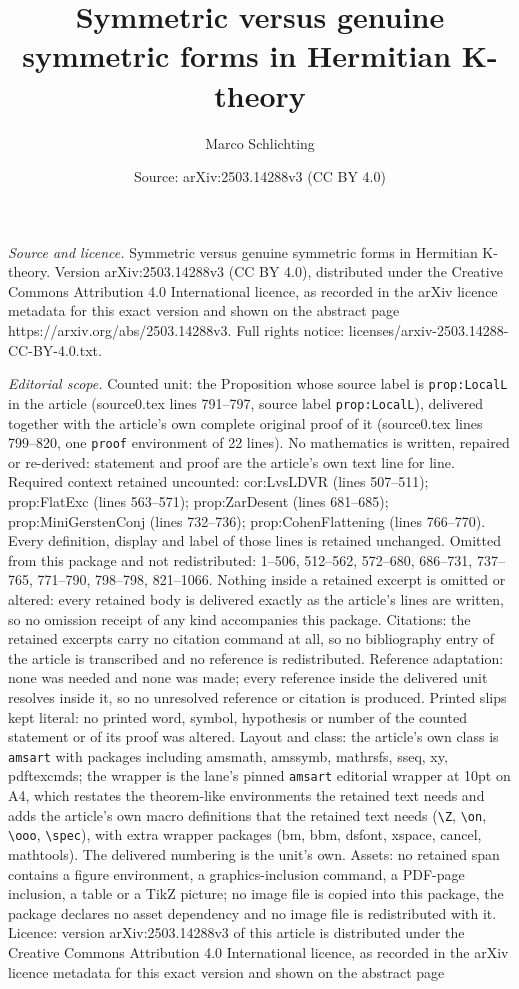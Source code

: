 \documentclass[10pt,a4paper]{amsart}
\title[Symmetric versus genuine symmetric forms in Hermitian K-theo]{Symmetric versus genuine symmetric forms in Hermitian K-theory}
\author{Marco Schlichting}
\date{Source: arXiv:2503.14288v3 (CC BY 4.0)}
\begin{document}
\maketitle

\noindent\emph{Source and licence.} Symmetric versus genuine symmetric forms in Hermitian K-theory. Version arXiv:2503.14288v3 (CC BY 4.0), distributed under the Creative Commons Attribution 4.0 International licence, as recorded in the arXiv licence metadata for this exact version and shown on the abstract page https://arxiv.org/abs/2503.14288v3. Full rights notice: licenses/arxiv-2503.14288-CC-BY-4.0.txt.\par\smallskip

\noindent\textit{Editorial scope.} Counted unit: the Proposition whose source label is \texttt{prop:LocalL} in the article (source0.tex lines 791--797, source label \texttt{prop:LocalL}), delivered together with the article's own complete original proof of it (source0.tex lines 799--820, one \texttt{proof} environment of 22 lines). No mathematics is written, repaired or re-derived: statement and proof are the article's own text line for line. Required context retained uncounted: cor:LvsLDVR (lines 507--511); prop:FlatExc (lines 563--571); prop:ZarDesent (lines 681--685); prop:MiniGerstenConj (lines 732--736); prop:CohenFlattening (lines 766--770). Every definition, display and label of those lines is retained unchanged. Omitted from this package and not redistributed: 1--506, 512--562, 572--680, 686--731, 737--765, 771--790, 798--798, 821--1066. Nothing inside a retained excerpt is omitted or altered: every retained body is delivered exactly as the article's lines are written, so no omission receipt of any kind accompanies this package. Citations: the retained excerpts carry no citation command at all, so no bibliography entry of the article is transcribed and no reference is redistributed. Reference adaptation: none was needed and none was made; every reference inside the delivered unit resolves inside it, so no unresolved reference or citation is produced. Printed slips kept literal: no printed word, symbol, hypothesis or number of the counted statement or of its proof was altered. Layout and class: the article's own class is \texttt{amsart} with packages including amsmath, amssymb, mathrsfs, sseq, xy, pdftexcmds; the wrapper is the lane's pinned \texttt{amsart} editorial wrapper at 10pt on A4, which restates the theorem-like environments the retained text needs and adds the article's own macro definitions that the retained text needs (\texttt{\textbackslash Z}, \texttt{\textbackslash on}, \texttt{\textbackslash ooo}, \texttt{\textbackslash spec}), with extra wrapper packages (bm, bbm, dsfont, xspace, cancel, mathtools). The delivered numbering is the unit's own. Assets: no retained span contains a figure environment, a graphics-inclusion command, a PDF-page inclusion, a table or a TikZ picture; no image file is copied into this package, the package declares no asset dependency and no image file is redistributed with it. Licence: version arXiv:2503.14288v3 of this article is distributed under the Creative Commons Attribution 4.0 International licence, as recorded in the arXiv licence metadata for this exact version and shown on the abstract page 
\end{document}
